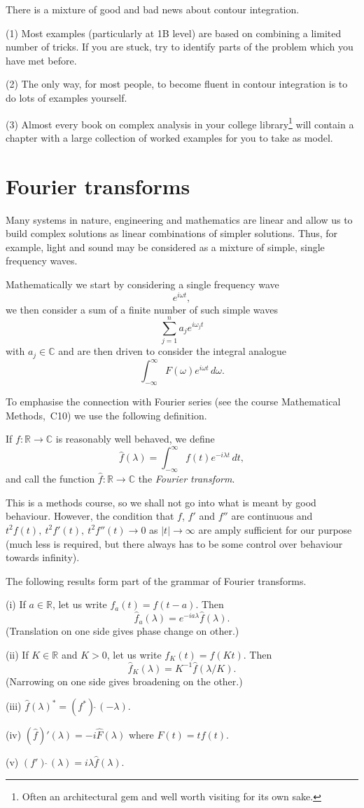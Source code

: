 There is a mixture of good and bad news about contour
integration.

(1) Most examples (particularly at 1B level) are based
on combining a limited number of tricks. If you are stuck,
try to identify parts of the problem which you have met before.

(2) The only way, for most people, to become fluent
in contour integration is to do lots of examples
yourself.

(3) Almost every book on complex analysis in your
college library\footnote{Often an architectural
gem and well worth visiting for its own sake.}
will contain a chapter with a large collection of
worked examples for you to take as model. 
\section{Fourier transforms} Many systems
in nature, engineering and mathematics are
linear and allow us to build complex solutions
as linear combinations of simpler solutions.
Thus, for example, light and sound may be considered
as a mixture of simple, single frequency waves.

Mathematically we start by considering a single
frequency wave
\[e^{i\omega t},\]
we then consider a sum of a finite number of such
simple waves
\[\sum_{j=1}^{n}a_{j}e^{i\omega_{j} t}\]
with $a_{j}\in{\mathbb C}$ and are then driven to consider
the integral analogue
\[\int_{-\infty}^{\infty}F(\omega)e^{i\omega t}\,d\omega.\]

To emphasise the connection with Fourier series
(see the course Mathematical Methods,~C10) we use the 
following definition.
\begin{definition} If $f:{\mathbb R}\rightarrow{\mathbb C}$
is reasonably well behaved, we define
\[\hat{f}(\lambda)
=\int_{-\infty}^{\infty}f(t)e^{-i\lambda t}\,dt,\]
and call the function
$\hat{f}:{\mathbb R}\rightarrow{\mathbb C}$
the \emph{Fourier transform}.
\end{definition}
This is a methods course, so we shall not go into what is meant
by good behaviour. However, the condition that $f$, $f'$ and $f''$
are continuous and 
$t^{2}f(t),\ t^{2}f'(t),\ t^{2}f''(t)\rightarrow 0$
as $|t|\rightarrow\infty$ are amply sufficient
for our purpose (much less is required,  but there
always has to be some control over behaviour towards
infinity).

The following results form part of the grammar of 
Fourier transforms.
\begin{lemma} (i) If $a\in{\mathbb R}$, let us write
$f_{a}(t)=f(t-a)$. Then 
\[\hat{f}_{a}(\lambda)=e^{-ia\lambda}\hat{f}(\lambda).\]
(Translation on one side gives phase change on other.)

(ii) If $K\in{\mathbb R}$ and $K>0$, let us write
$f_{K}(t)=f(Kt)$. Then
\[\hat{f}_{K}(\lambda)=K^{-1}\hat{f}(\lambda/K).\]
(Narrowing on one side gives broadening on the other.)

(iii) $\hat{f}(\lambda)^{*}=(f^{*})\hat{\ }(-\lambda)$.

(iv) $(\hat{f})'(\lambda)
=-i\hat{F}(\lambda)$ where $F(t)=tf(t)$.

(v) $(f')\hat{\ }(\lambda)=i\lambda\hat{f}(\lambda)$.
\end{lemma}


